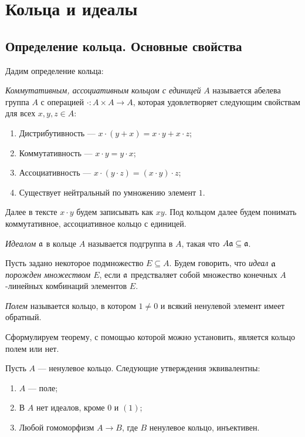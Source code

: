 \section{Кольца и идеалы}
    \subsection{Определение кольца. Основные свойства}
    Дадим определение кольца:
    \begin{Def}
        \textit{Коммутативным, ассоциативным кольцом с единицей} $A$ называется абелева группа $A$ 
        с операцией $\cdot : A \times A \rightarrow A$, которая удовлетворяет следующим свойствам для всех $x, y, z \in A$:
        \begin{enumerate}
            \item Дистрибутивность --- $x \cdot (y + x) = x\cdot y + x\cdot z$;
            \item Коммутативность --- $x \cdot y = y \cdot x$;
            \item Ассоциативность --- $x\cdot(y \cdot z) = (x \cdot y) \cdot z$;
            \item Существует нейтральный по умножению элемент $1$.
        \end{enumerate}
    \end{Def}
    Далее в тексте $x \cdot y$ будем записывать как $xy$. Под кольцом далее будем понимать коммутативное, ассоциативное кольцо с единицей. 
    
    \begin{Def}
        \textit{Идеалом} $\mathfrak{a}$ в кольце $A$ называется подгруппа в $A$, такая что $A\mathfrak{a} \subseteq \mathfrak{a}$.
    \end{Def}

    \begin{Def}
        Пусть задано некоторое подмножество $E \subseteq A$. Будем говорить, что \textit{ идеал $\mathfrak{a}$ порожден множеством $E$}, если $\mathfrak{a}$ предстваляет собой множество
        конечных $A$-линейных комбинаций элементов $E$.
    \end{Def}

    \begin{Def}
        \textit{Полем} называется кольцо, в котором $1 \neq 0$ и всякий ненулевой элемент имеет обратный.
    \end{Def}

    Сформулируем теорему, с помощью которой можно установить, является кольцо полем или нет.
    \begin{Theorem}\cite{A-M}
        Пусть $A$ --- ненулевое кольцо. Следующие утверждения эквивалентны:
        \begin{enumerate}
            \item $A$ --- поле;
            \item В $A$ нет идеалов, кроме $0$ и $(1)$;
            \item Любой гомоморфизм $A \rightarrow B$, где $B$ ненулевое кольцо, инъективен.
        \end{enumerate}
    \end{Theorem}

